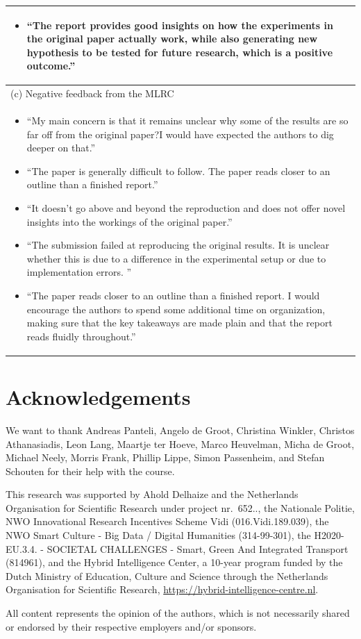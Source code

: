 \documentclass[letterpaper]{article}
\begin{document}
\begin{table}[htbp!]
\begin{tabular}{@{}l@{}}
\begin{minipage}[t]{\columnwidth}
\begin{itemize}[leftmargin=*]
\item ``The report provides good insights on how the experiments in the original paper actually work, while also generating new hypothesis to be tested for future research, which is a positive outcome.''
\end{itemize}
\end{minipage}
\\
\midrule
(c) Negative feedback from the MLRC \\
\midrule
\begin{minipage}[t]{\columnwidth}
\begin{itemize}[leftmargin=*]
\item ``My main concern is that it remains unclear why some of the results are so far off from the original paper?I would have expected the authors to dig deeper on that.''
\item ``The paper is generally difficult to follow. The paper reads closer to an outline than a finished report.''
\item ``It doesn't go above and beyond the reproduction and does not offer novel insights into the workings of the original paper.''
\item ``The submission failed at reproducing the original results. It is unclear whether this is due to a difference in the experimental setup or due to implementation errors. ''
\item ``The paper reads closer to an outline than a finished report. I would encourage the authors to spend some additional time on organization, making sure that the key takeaways are made plain and that the report reads fluidly throughout.''
\end{itemize}
\end{minipage}
\\
\bottomrule
\end{tabular}
\label{tab:feedback}
\end{table}


\section*{Acknowledgements}
We want to thank
Andreas Panteli,
Angelo de Groot,
Christina Winkler,
Christos Athanasiadis,
Leon Lang,
Maartje ter Hoeve,
Marco Heuvelman,
Micha de Groot,
Michael Neely,
Morris Frank,
Phillip Lippe,
Simon Passenheim, and
Stefan Schouten
for their help with the course.

This research was supported by Ahold Delhaize and the Netherlands Organisation for Scientific Research under project nr.\ 652.., the Nationale Politie, NWO Innovational Research Incentives Scheme Vidi (016.Vidi.189.039), the NWO Smart Culture - Big Data / Digital Humanities (314-99-301), the H2020-EU.3.4. - SOCIETAL CHALLENGES - Smart, Green And Integrated Transport (814961), and the Hybrid Intelligence Center, a 10-year program funded by the Dutch Ministry of Education, Culture and Science through the Netherlands Organisation for Scientific Research,
\url{https://hybrid-intelligence-centre.nl}.

All content represents the opinion of the authors, which is not necessarily shared or endorsed by their respective employers and/or sponsors.


\clearpage

\end{document}
